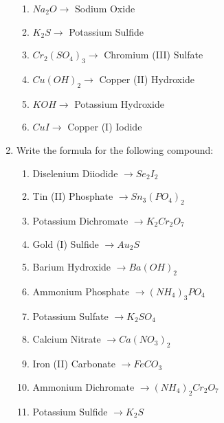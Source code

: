 \documentclass[12pt]{article}
\begin{document}
\begin{enumerate}
\begin{enumerate}
      \item $Na_2O \rightarrow$ Sodium Oxide

      \item $K_2S \rightarrow$ Potassium Sulfide

      \item $Cr_2(SO_4)_3 \rightarrow$ Chromium (III) Sulfate

      \item $Cu(OH)_2 \rightarrow$ Copper (II) Hydroxide

      \item $KOH \rightarrow$ Potassium Hydroxide

      \item $CuI \rightarrow$ Copper (I) Iodide

    \end{enumerate}

  \item Write the formula for the following compound:
    
    \begin{enumerate}

      \item Diselenium Diiodide $\rightarrow Se_2I_2$

      \item Tin (II) Phosphate $\rightarrow Sn_3(PO_4)_2$

      \item Potassium Dichromate $\rightarrow K_2Cr_2O_7$

      \item Gold (I) Sulfide $\rightarrow Au_2S$

      \item Barium Hydroxide $\rightarrow Ba(OH)_2$

      \item Ammonium Phosphate $\rightarrow (NH_4)_3PO_4$

      \item Potassium Sulfate $\rightarrow K_2SO_4$

      \item Calcium Nitrate $\rightarrow Ca(NO_3)_2$

      \item Iron (II) Carbonate $\rightarrow FeCO_3$

      \item Ammonium Dichromate $\rightarrow (NH_4)_2Cr_2O_7$

      \item Potassium Sulfide $\rightarrow K_2S$


\end{enumerate}
\end{enumerate}
\end{document}
